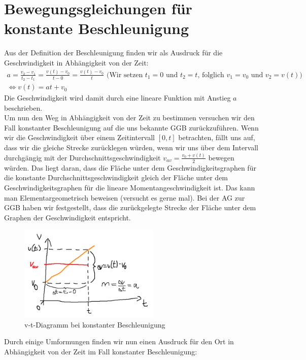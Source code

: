 \documentclass[11pt]{article}
\begin{document}
\section{Bewegungsgleichungen für konstante Beschleunigung}
Aus der Definition der Beschleunigung finden wir als Ausdruck für die Geschwindigkeit in Abhängigkeit von der Zeit:
\begin{gather}
    \nonumber a = \frac{v_2 - v_1}{t_2 - t_1} = \frac{v(t)-v_0}{t-0} = \frac{v(t) - v_0}{t} \text{ (Wir setzen } t_1 = 0 \text{ und } t_2 = t \text{, folglich } v_1 = v_0 \text{ und } v_2 = v(t) \text{)} \\
    \Longleftrightarrow v(t) = at+v_0
\end{gather}
Die Geschwindigkeit wird damit durch eine lineare Funktion mit Anstieg $a$ beschrieben. \\
Um nun den Weg in Abhängigkeit von der Zeit zu bestimmen versuchen wir den Fall konstanter Beschleunigung auf die uns bekannte GGB zurückzuführen. Wenn wir die Geschwindigkeit über einem Zeitintervall $[0, t]$ betrachten, fällt uns auf, dass wir die gleiche Strecke zurücklegen würden, wenn wir uns über dem Intervall durchgängig mit der Durchschnittsgeschwindigkeit $\displaystyle v_{av} = \frac{v_0 + v(t)}{2}$ bewegen würden. Das liegt daran, dass die Fläche unter dem Geschwindigkeitsgraphen für die konstante Durchschnittsgeschwindigkeit gleich der Fläche unter dem Geschwindigkeitsgraphen für die lineare Momentangeschwindigkeit ist. Das kann man Elementargeometrisch beweisen (versucht es gerne mal). Bei der AG zur GGB haben wir festgestellt, dass die zurückgelegte Strecke der Fläche unter dem Graphen der Geschwindigkeit entspricht. 
\begin{figure}[H] 
    \centering
    \includegraphics[width=0.6\textwidth]{v-t-diagramm-a-const.png}
    \caption{v-t-Diagramm bei konstanter Beschleunigung}
\end{figure} 
Durch einige Umformungen finden wir nun einen Ausdruck für den Ort in Abhängigkeit von der Zeit im Fall konstanter Beschleunigung: 
\end{document}

